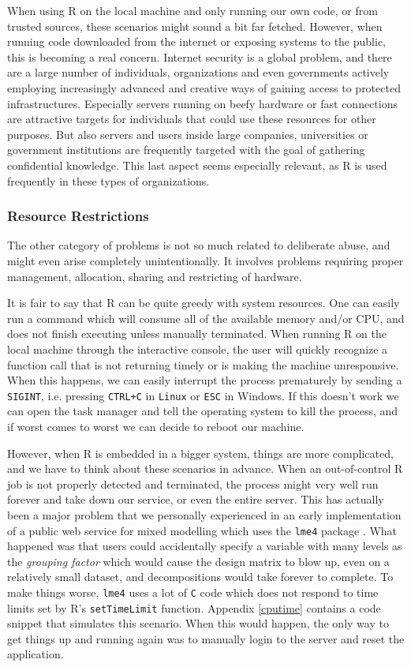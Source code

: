 \documentclass[article]{jss}
\newcommand{\R}{\textsf{R}\xspace}
\newcommand{\Linux}{\texttt{Linux}\xspace}
\begin{document}
When using \R on the local machine and only running our own code, or
from trusted sources, these scenarios might sound a bit far fetched. However,
when running code downloaded from the internet or exposing systems to the
public, this is becoming a real concern. Internet security is a global problem,
and there are a large number of individuals, organizations and even governments
actively employing increasingly advanced and creative ways of gaining access to
protected infrastructures. Especially servers running on beefy hardware or
fast connections are attractive targets for individuals that could use these
resources for other purposes. But also servers and users inside large companies,
universities or government institutions are frequently targeted with the goal
of gathering confidential knowledge. This last aspect seems especially
relevant, as \R is used frequently in these types of organizations.

\subsubsection{Resource Restrictions}

The other category of problems is not so much related to deliberate abuse, and
might even arise completely unintentionally. It involves problems requiring
proper management, allocation, sharing and restricting of hardware. 

It is fair to say that \R can be quite greedy with system resources.
One can easily run a command which will consume all of the available memory
and/or CPU, and does not finish executing unless manually terminated. When
running \R on the local machine through the interactive console, the
user will quickly recognize a function call that is not returning timely or is
making the machine unresponsive. When this happens, we can easily interrupt the
process prematurely by sending a \texttt{SIGINT}, i.e. pressing \texttt{CTRL+C}
in \Linux or \texttt{ESC} in Windows. If this doesn't work we can open the task
manager and tell the operating system to kill the process, and if worst comes
to worst we can decide to reboot our machine.

However, when \R is embedded in a bigger system, things are
more complicated, and we have to think about these scenarios in advance. When
an out-of-control \R job is not properly detected and terminated, the process
might very well run forever and take down our service, or even the entire server. This has
actually been a major problem that we personally experienced in an early
implementation of a public web service for mixed modelling \citep{yeroonlme4}
which uses the \texttt{lme4} package \citep{lme4}. What happened was that users
could accidentally specify a variable with many levels as the \emph{grouping
factor} which would cause the design matrix to blow up, even on a relatively
small dataset, and decompositions would take forever to complete. To make
things worse, \texttt{lme4} uses a lot of \texttt{C} code which does not
respond to time limits set by R's \texttt{setTimeLimit} function. Appendix
\ref{cputime} contains a code snippet that simulates this scenario. When this
would happen, the only way to get things up and running again was to manually
login to the server and reset the application.
\end{document}
